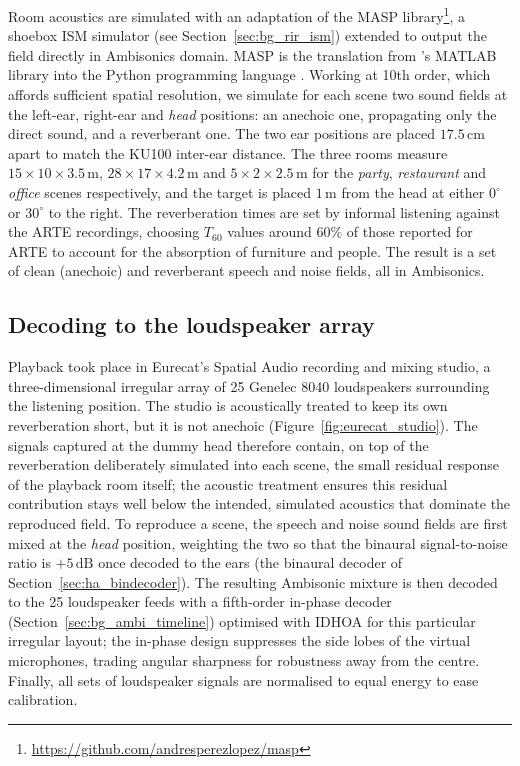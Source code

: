 Room acoustics are simulated with an adaptation of the \acrfull{MASP} library\footnote{\url{https://github.com/andresperezlopez/masp}}, a shoebox \acrshort{ISM} simulator (see Section~\ref{sec:bg_rir_ism})
extended to output the field directly in Ambisonics domain. \acrshort{MASP} is the translation from \citet*{politis2016microphone}'s MATLAB library into the Python programming language \citep{perez2020parametric}. Working at 10th order, which affords sufficient spatial
resolution, we simulate for each scene two sound fields at the left-ear,
right-ear and \emph{head} positions: an anechoic one, propagating only the
direct sound, and a reverberant one. The two ear positions are placed
$17.5\,\text{cm}$ apart to match the \acrshort{KU100} inter-ear distance. The
three rooms measure $15\times10\times3.5\,\text{m}$,
$28\times17\times4.2\,\text{m}$ and $5\times2\times2.5\,\text{m}$ for the
\emph{party}, \emph{restaurant} and \emph{office} scenes respectively, and the
target is placed $1\,\text{m}$ from the head at either $0^{\circ}$ or
$30^{\circ}$ to the right. The reverberation times are set by informal
listening against the ARTE recordings, choosing $T_{60}$ values
around $60\%$ of those reported for ARTE to account for the
absorption of furniture and people. The result is a set of clean (anechoic)
and reverberant speech and noise fields, all in Ambisonics.

\subsection{Decoding to the loudspeaker array}
\label{sec:ha_lsdecoding}

Playback took place in Eurecat's Spatial Audio recording and mixing studio, a three-dimensional
irregular array of 25 Genelec 8040 loudspeakers surrounding the listening
position. The studio is acoustically treated to keep its own reverberation short, but
it is not anechoic (Figure~\ref{fig:eurecat_studio}). The signals captured at the
dummy head therefore contain, on top of the reverberation deliberately
simulated into each scene, the small residual response of the playback room
itself; the acoustic treatment ensures this residual contribution stays well
below the intended, simulated acoustics that dominate the reproduced field. To reproduce a scene, the speech and noise sound fields are first
mixed at the \emph{head} position, weighting the two so that the binaural
signal-to-noise ratio is $+5\,\text{dB}$ once decoded to the ears (the
binaural decoder of Section~\ref{sec:ha_bindecoder}). The resulting Ambisonic
mixture is then decoded to the 25 loudspeaker feeds with a fifth-order
in-phase decoder (Section~\ref{sec:bg_ambi_timeline}) optimised with IDHOA
\citep{scaini2014decoding} for this particular irregular layout; the in-phase
design suppresses the side lobes of the virtual microphones, trading angular
sharpness for robustness away from the centre. Finally, all sets of
loudspeaker signals are normalised to equal energy to ease calibration.

